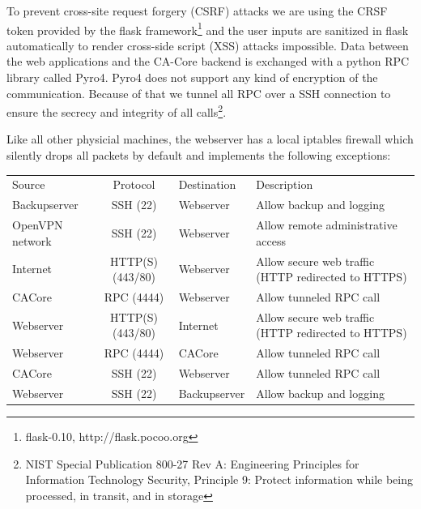 \documentclass[a4paper, toc=index, 12pt, DIV14, twoside, BCOR2cm, headsepline, numbers=noenddot, bibliography=totoc]{report}
\begin{document}
\begin{description}
To prevent cross-site request forgery (CSRF) attacks we are using the CRSF token provided by the flask framework\footnote{flask-0.10, http://flask.pocoo.org} and the user inputs are sanitized in flask automatically to render cross-side script (XSS) attacks impossible.\newline
Data between the web applications and the CA-Core backend is exchanged with a python RPC library called Pyro4. Pyro4 does not support any kind of encryption of the communication. Because of that we tunnel all RPC over a SSH connection to ensure the secrecy and integrity of all calls\footnote{NIST Special Publication 800-27 Rev A: Engineering Principles for Information Technology Security, Principle 9: Protect information while being processed, in transit, and in storage}.

Like all other physicial machines, the webserver has a local iptables firewall which silently drops all packets by default and implements the following exceptions:


\begin{tabular}{p{2.5cm} c l p{4.5cm}}
Source & Protocol & Destination & Description\\
\cline{1-4}
Backupserver & SSH (22) & Webserver & Allow backup and logging\\
\cline{1-4}
OpenVPN network & SSH (22) & Webserver & Allow remote administrative access \\
\cline{1-4}
Internet & HTTP(S) (443/80) & Webserver & Allow secure web traffic (HTTP redirected to HTTPS)\\
\cline{1-4}
CACore & RPC (4444) & Webserver & Allow tunneled RPC call\\
\cline{1-4}
Webserver & HTTP(S) (443/80) & Internet & Allow secure web traffic (HTTP redirected to HTTPS)\\
\cline{1-4}
Webserver & RPC (4444) &  CACore& Allow tunneled RPC call\\
\cline{1-4}
CACore & SSH (22) & Webserver & Allow tunneled RPC call\\
\cline{1-4}
Webserver & SSH (22) & Backupserver & Allow backup and logging\\
\end{tabular}


\end{description}
\end{document}
